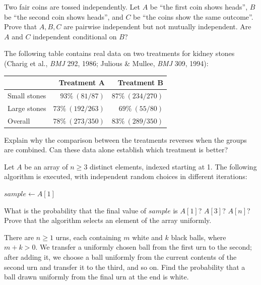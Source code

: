 \documentclass[11pt,a4paper]{article}
\newcounter{problem}[section]
\begin{document}
\begin{problem}
Two fair coins are tossed independently. Let $A$ be ``the first coin shows heads'',
$B$ be ``the second coin shows heads'', and $C$ be ``the coins show the same outcome''.
Prove that $A,B,C$ are pairwise independent but not mutually independent.
Are $A$ and $C$ independent conditional on $B$?
\end{problem}
\begin{probleminteresting}
The following table contains real data on two treatments for kidney stones
(Charig et al., \emph{BMJ} 292, 1986; Julious \& Mullee, \emph{BMJ} 309, 1994):
\begin{center}\small
\begin{tabular}{@{}lrr@{}}
\toprule
 & Treatment A & Treatment B \\
\midrule
Small stones & $93\%\ (81/87)$ & $87\%\ (234/270)$ \\
Large stones & $73\%\ (192/263)$ & $69\%\ (55/80)$ \\
Overall & $78\%\ (273/350)$ & $83\%\ (289/350)$ \\
\bottomrule
\end{tabular}\end{center}
Explain why the comparison between the treatments reverses when the groups are combined.
Can these data alone establish which treatment is better?
\end{probleminteresting}
\begin{probleminteresting}
Let $A$ be an array of $n\ge3$ distinct elements, indexed starting at 1.
The following algorithm is executed, with independent random choices in different iterations:
\begin{algorithm}[H]
\caption{Reservoir sampling for one element}
$sample \gets A[1]$\;
\end{algorithm}
What is the probability that the final value of $sample$ is $A[1]$? $A[3]$? $A[n]$?
Prove that the algorithm selects an element of the array uniformly.
\end{probleminteresting}
\begin{problem}
There are $n\ge1$ urns, each containing $m$ white and $k$ black balls, where $m+k>0$.
We transfer a uniformly chosen ball from the first urn to the second; after adding it,
we choose a ball uniformly from the current contents of the second urn and transfer
it to the third, and so on. Find the probability that a ball drawn uniformly from
the final urn at the end is white.
\end{problem}
\end{document}
